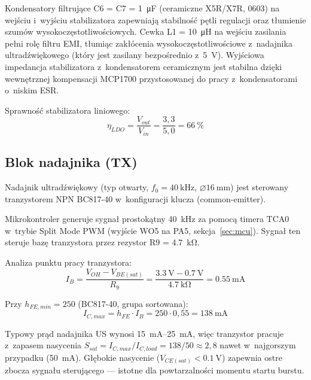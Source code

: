\documentclass[a4paper,11pt]{article}
\begin{document}
	Kondensatory filtrujące C6 = C7 = \SI{1}{\micro\farad} (ceramiczne X5R/X7R, 0603)
	na wejściu i~wyjściu stabilizatora zapewniają stabilność pętli regulacji
	oraz tłumienie szumów wysokoczęstotliwościowych. Cewka L1 = \SI{10}{\micro\henry}
	na wejściu zasilania pełni rolę filtru EMI, tłumiąc zakłócenia
	wysokoczęstotliwościowe z~nadajnika ultradźwiękowego (który jest zasilany
	bezpośrednio z~\SI{5}{\volt}). Wyjściowa impedancja
	stabilizatora z~kondensatorem ceramicznym jest stabilna dzięki wewnętrznej
	kompensacji MCP1700 przystosowanej do pracy z~kondensatorami o~niskim ESR.
	
	Sprawność stabilizatora liniowego:
	\begin{equation}
		\eta_{LDO} = \frac{V_{out}}{V_{in}} = \frac{3{,}3}{5{,}0} = \SI{66}{\percent}
		\label{eq:sprawnosc_ldo}
	\end{equation}
	
	\subsection{Blok nadajnika (TX)}
	\label{sec:nadajnik}
	
	Nadajnik ultradźwiękowy (typ otwarty, $f_0 = \SI{40}{\kilo\hertz}$,
	$\varnothing\SI{16}{\milli\metre}$) jest sterowany tranzystorem NPN BC817-40
	w~konfiguracji klucza (common-emitter).
	
	Mikrokontroler generuje sygnał prostokątny \SI{40}{\kilo\hertz} za pomocą
	timera TCA0 w~trybie Split Mode PWM (wyjście WO5 na PA5, sekcja~\ref{sec:mcu}).
	Sygnał ten steruje bazę tranzystora
	przez rezystor R9 = \SI{4,7}{\kilo\ohm}.
	
	Analiza punktu pracy tranzystora:
	\begin{equation}
		I_B = \frac{V_{OH} - V_{BE(sat)}}{R_9} = \frac{\SI{3,3}{\volt} - \SI{0,7}{\volt}}{\SI{4,7}{\kilo\ohm}} = \SI{0,55}{\milli\ampere}
		\label{eq:ib}
	\end{equation}
	
	Przy $h_{FE,min} = 250$ (BC817-40, grupa sortowana):
	\begin{equation}
		I_{C,max} = h_{FE} \cdot I_B = 250 \cdot 0{,}55 = \SI{138}{\milli\ampere}
		\label{eq:ic_max}
	\end{equation}
	
	Typowy prąd nadajnika US wynosi \SIrange{15}{25}{\milli\ampere}, więc
	tranzystor pracuje z~zapasem nasycenia $S_{sat} = I_{C,max} / I_{C,load}
	= 138/50 \approx 2{,}8$ nawet w~najgorszym przypadku (\SI{50}{\milli\ampere}).
	Głębokie nasycenie ($V_{CE(sat)} < \SI{0,1}{\volt}$) zapewnia ostre zbocza
	sygnału sterującego --- istotne dla powtarzalności momentu startu burstu.
	
\end{document}
